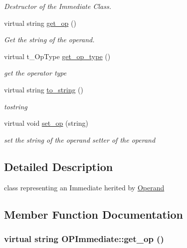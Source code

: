 \begin{DoxyCompactItemize}
\begin{DoxyCompactList}\small\item\em Destructor of the Immediate Class. \item\end{DoxyCompactList}\item 
virtual string \hyperlink{classOPImmediate_ad714fb614c0d8f4afa1157a34b2936fd}{get\_\-op} ()
\begin{DoxyCompactList}\small\item\em Get the string of the operand. \item\end{DoxyCompactList}\item 
virtual t\_\-OpType \hyperlink{classOPImmediate_aed01353798ae57936a9f77dd05eafa88}{get\_\-op\_\-type} ()
\begin{DoxyCompactList}\small\item\em get the operator type \item\end{DoxyCompactList}\item 
virtual string \hyperlink{classOPImmediate_a12bc613de3bff73ead8632dafd8050a0}{to\_\-string} ()
\begin{DoxyCompactList}\small\item\em tostring \item\end{DoxyCompactList}\item 
\hypertarget{classOPImmediate_ae5d6c30c6bff17de4e7fabb24cf6bf59}{
virtual void \hyperlink{classOPImmediate_ae5d6c30c6bff17de4e7fabb24cf6bf59}{set\_\-op} (string)}
\label{classOPImmediate_ae5d6c30c6bff17de4e7fabb24cf6bf59}

\begin{DoxyCompactList}\small\item\em set the string of the operand setter of the operand \item\end{DoxyCompactList}\end{DoxyCompactItemize}


\subsection{Detailed Description}
class representing an Immediate herited by \hyperlink{classOperand}{Operand} 

\subsection{Member Function Documentation}
\hypertarget{classOPImmediate_ad714fb614c0d8f4afa1157a34b2936fd}{
\subsubsection[{get\_\-op}]{\setlength{\rightskip}{0pt plus 5cm}virtual string OPImmediate::get\_\-op ()}}
\label{classOPImmediate_ad714fb614c0d8f4afa1157a34b2936fd}


